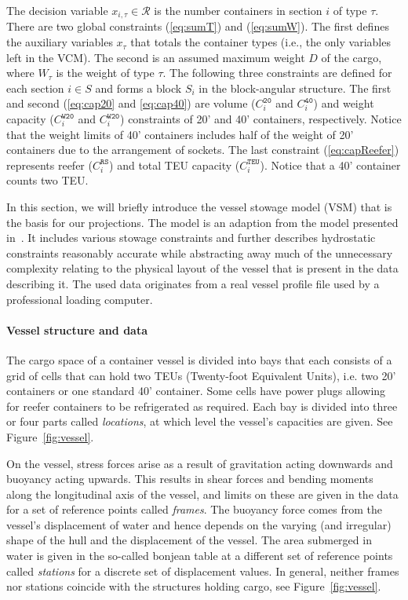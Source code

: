 \documentclass{llncs}
\newcommand{\trt}[1]{\texttt{#1}}
\begin{document}
The decision variable $x_{i,\tau} \in \mathcal{R}$ is the number containers in section $i$ of type $\tau$. There are two global constraints (\ref{eq:sumT}) and (\ref{eq:sumW}). The first defines the auxiliary variables $x_\tau$ that totals the container types (i.e., the only variables left in the VCM). The second is an assumed maximum weight $D$ of the cargo, where $W_\tau$ is the weight of type $\tau$. The following three constraints are defined for each section $i \in S$ and forms a block $S_i$ in the block-angular structure. The first and second (\ref{eq:cap20} and \ref{eq:cap40}) are volume ($C_i^\trt{20}$ and $C_i^\trt{40}$) and weight capacity ($C_i^\trt{W20}$ and $C_i^\trt{W20}$) constraints of 20' and 40' containers, respectively. Notice that the weight limits of 40' containers includes half of the weight of 20' containers due to the arrangement of sockets. The last constraint (\ref{eq:capReefer})  represents reefer ($C_i^\trt{RS}$) and total TEU capacity ($C_i^\trt{TEU}$). Notice that a 40' container counts two TEU.    






\vspace{2cm}




In this section, we will briefly introduce the vessel stowage model (VSM) that is the basis for our projections. The model is an adaption from the model presented in~\cite{ICCL18}. 
It includes various stowage constraints and further describes hydrostatic constraints reasonably accurate while
abstracting away much of the unnecessary complexity relating to the physical layout of the vessel that is present in the data describing it. 
The used data originates from a real vessel profile file used by a professional loading computer. 

\paragraph{Vessel structure and data}
The cargo space of a container vessel is divided into {bays} that each consists of a grid of {cells} that can hold two TEUs (Twenty-foot Equivalent Units), i.e. two 20' containers or one standard 40' container. Some cells have power plugs allowing for {reefer} containers to be refrigerated as required. Each bay is divided into three or four parts called \emph{locations}, at which level the vessel's capacities are given. See Figure~\ref{fig:vessel}.

On the vessel, stress forces arise as a result of gravitation acting downwards and buoyancy acting upwards. This results in shear forces and bending moments along the longitudinal axis of the vessel, and limits on these are given in the data for a set of reference points called \emph{frames}. The buoyancy force comes from the vessel's displacement of water and hence depends on the varying (and irregular) shape of the hull and the displacement of the vessel. The area submerged in water is given in the so-called bonjean table at a different set of reference points called \emph{stations} for a discrete set of displacement values. 
In general, neither frames nor stations coincide with the structures holding cargo, see Figure~\ref{fig:vessel}.
\end{document}
